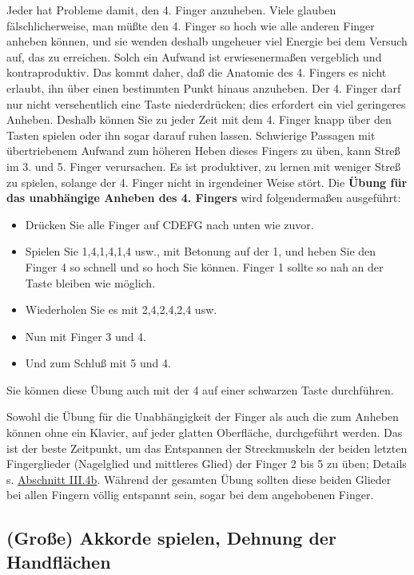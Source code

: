 Jeder hat Probleme damit, den 4. Finger anzuheben.
Viele glauben fälschlicherweise, man müßte den 4. Finger so hoch wie alle anderen Finger anheben können, und sie wenden deshalb ungeheuer viel Energie bei dem Versuch auf, das zu erreichen.
Solch ein Aufwand ist erwiesenermaßen vergeblich und kontraproduktiv.
Das kommt daher, daß die Anatomie des 4. Fingers es nicht erlaubt, ihn über einen bestimmten Punkt hinaus anzuheben.
Der 4. Finger darf nur nicht versehentlich eine Taste niederdrücken; dies erfordert ein viel geringeres Anheben.
Deshalb können Sie zu jeder Zeit mit dem 4. Finger knapp über den Tasten spielen oder ihn sogar darauf ruhen lassen.
Schwierige Passagen mit übertriebenem Aufwand zum höheren Heben dieses Fingers zu üben, kann Streß im 3. und 5. Finger verursachen.
Es ist produktiver, zu lernen mit weniger Streß zu spielen, solange der 4. Finger nicht in irgendeiner Weise stört.
\hypertarget{c1iii7finger4}{}
Die \textbf{Übung für das unabhängige Anheben des 4. Fingers} wird folgendermaßen ausgeführt:

\begin{itemize} 
 \item Drücken Sie alle Finger auf CDEFG nach unten wie zuvor.
 \item Spielen Sie 1,4,1,4,1,4 usw., mit Betonung auf der 1, und heben Sie den Finger 4 so schnell und so hoch Sie können.
 Finger 1 sollte so nah an der Taste bleiben wie möglich.
 \item Wiederholen Sie es mit 2,4,2,4,2,4 usw.
 \item Nun mit Finger 3 und 4.
 \item Und zum Schluß mit 5 und 4.
 \end{itemize}
Sie können diese Übung auch mit der 4 auf einer schwarzen Taste durchführen.

Sowohl die Übung für die Unabhängigkeit der Finger als auch die zum Anheben können ohne ein Klavier, auf jeder glatten Oberfläche, durchgeführt werden.
Das ist der beste Zeitpunkt, um das Entspannen der Streckmuskeln der beiden letzten Fingerglieder (Nagelglied und mittleres Glied) der Finger 2 bis 5 zu üben; Details s. \hyperlink{c1iii4b}{Abschnitt III.4b}.
Während der gesamten Übung sollten diese beiden Glieder bei allen Fingern völlig entspannt sein, sogar bei dem angehobenen Finger.
 

\subsection{(Große) Akkorde spielen, Dehnung der Handflächen}\hypertarget{c1iii7e}{}

